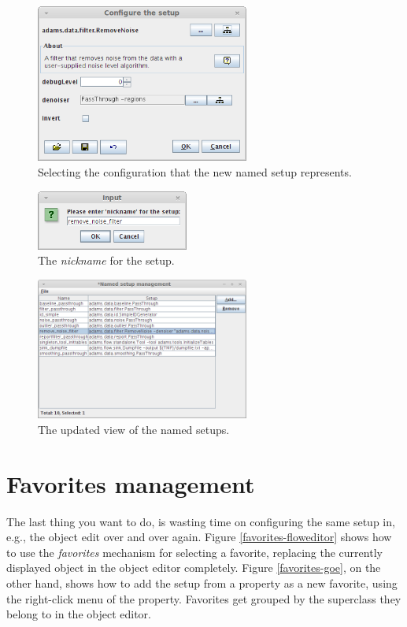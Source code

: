 \begin{figure}[htb]
  \centering
  \includegraphics[width=7.0cm]{images/namedsetupmanagement-add2.png}
  \caption{Selecting the configuration that the new named setup represents.}
  \label{namedsetupmanagement-add2}
\end{figure}

\begin{figure}[htb]
  \centering
  \includegraphics[width=5.0cm]{images/namedsetupmanagement-add3.png}
  \caption{The \textit{nickname} for the setup.}
  \label{namedsetupmanagement-add3}
\end{figure}

\begin{figure}[htb]
  \centering
  \includegraphics[width=7.0cm]{images/namedsetupmanagement-add4.png}
  \caption{The updated view of the named setups.}
  \label{namedsetupmanagement-add4}
\end{figure}

\clearpage \newpage
\section{Favorites management}
The last thing you want to do, is wasting time on configuring the same setup in,
e.g., the object edit over and over again. Figure \ref{favorites-floweditor}
shows how to use the \textit{favorites} mechanism for selecting a favorite,
replacing the currently displayed object in the object editor completely. Figure
\ref{favorites-goe}, on the other hand, shows how to add the setup from a
property as a new favorite, using the right-click menu of the property.
Favorites get grouped by the superclass they belong to in the object editor.

